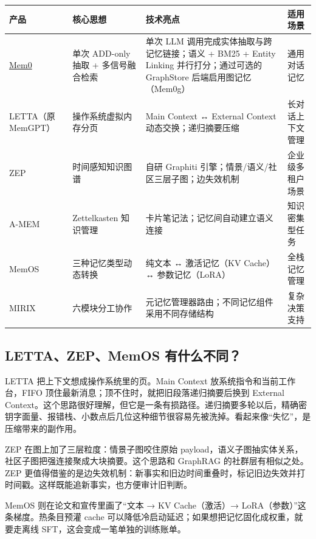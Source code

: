 \documentclass[9pt,a4paper,twocolumn]{ctexart}
\begin{document}
{\footnotesize
\begin{tabular}{|p{}|p{}|p{}|p{}|}
\hline
\textbf{产品} & \textbf{核心思想} & \textbf{技术亮点} & \textbf{适用场景} \\
\hline
\href{https://github.com/mem0ai/mem0}{Mem0} & 单次 ADD-only 抽取 + 多信号融合检索 & 单次 LLM 调用完成实体抽取与跨记忆链接；语义 + BM25 + Entity Linking 并行打分；通过可选的 GraphStore 后端启用图记忆（Mem0g） & 通用对话记忆 \\
\hline
LETTA（原 MemGPT） & 操作系统虚拟内存分页 & Main Context ↔ External Context 动态交换；递归摘要压缩 & 长对话上下文管理 \\
\hline
ZEP & 时间感知知识图谱 & 自研 Graphiti 引擎；情景/语义/社区三层子图；边失效机制 & 企业级多租户场景 \\
\hline
A-MEM & Zettelkasten 知识管理 & 卡片笔记法；记忆间自动建立语义连接 & 知识密集型任务 \\
\hline
MemOS & 三种记忆类型动态转换 & 纯文本 ↔ 激活记忆（KV Cache）↔ 参数记忆（LoRA） & 全栈记忆管理 \\
\hline
MIRIX & 六模块分工协作 & 元记忆管理器路由；不同记忆组件采用不同存储结构 & 复杂决策支持 \\
\hline
\end{tabular}
}



\subsection*{LETTA、ZEP、MemOS 有什么不同？}


LETTA 把上下文想成操作系统里的页。Main Context 放系统指令和当前工作台，FIFO 顶住最新消息；顶不住时，就把旧段落递归摘要后换到 External Context。这个思路很好理解，但它是一条有损路径。递归摘要多轮以后，精确密钥字面量、报错栈、小数点后几位这种细节很容易先被洗掉。看起来像“失忆”，是压缩带来的副作用。



ZEP 在图上加了三层粒度：情景子图咬住原始 payload，语义子图抽实体关系，社区子图把强连接聚成大块摘要。这个思路和 GraphRAG 的社群层有相似之处。ZEP 更值得借鉴的是边失效机制：新事实和旧边时间重叠时，标记旧边失效并打时间戳。这样既能追新事实，也方便审计旧判断。



MemOS 则在论文和宣传里画了“文本 → KV Cache（激活）→ LoRA（参数）”这条梯度。热条目预灌 cache 可以降低冷启动延迟；如果想把记忆固化成权重，就要走离线 SFT，这会变成一笔单独的训练账单。
\end{document}

